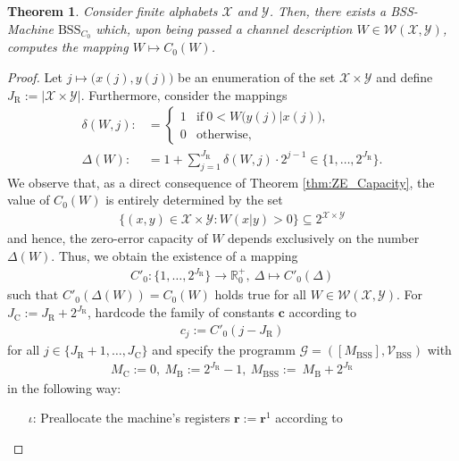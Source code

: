 \documentclass[conference]{IEEEtran}
\def\X{{\mathcal X}}
\def\Y{{\mathcal Y}}
\def\G{{\mathcal G}}
\def\V{{\mathcal V}}
\def\W{{\mathcal W}}
\def\RR{{\mathbb R}}
\newcommand{\BSS}{\mathrm{BSS}}
\newtheorem{Theorem}{Theorem}
\begin{document}
	\begin{Theorem}	\label{thm:ZeroErrorBSScomputable}
					Consider finite alphabets \(\X\) and \(\Y\). Then, there exists a BSS-Machine \(\BSS_{C_0}\)
					which, upon being passed a channel description \(W\in \W(\X,\Y)\), computes the mapping \(W \mapsto C_0(W)\).
	\end{Theorem}\begin{proof}
					Let \(j \mapsto \big(x(j), y(j)\big)\) be an enumeration of the set \(\X\times\Y\) and define
					\(J_\mathrm{R} := |\X\times \Y|\). Furthermore, consider the mappings
					\begin{align*}	\delta(W,j) :&=     \begin{cases}   1   &\text{if}~ 0 < W\big(y(j)|x(j)\big), \\
																		0   &\text{otherwise},
														\end{cases}\\
									\Delta(W)   :&=     1 + \sum_{j=1}^{J_\mathrm{R}} \delta(W,j)\cdot 2^{j-1} \in \big\{1,\ldots,2^{J_\mathrm{R}}\big\}.
					\end{align*} 
					We observe that, as a direct consequence of Theorem \ref{thm:ZE_Capacity}, the value of \(C_0(W)\) is 
					entirely determined by the set 
					\begin{align*}   \{(x,y) \in \X\times \Y : W(x|y) > 0\} \subseteq 2^{\X\times\Y}
					\end{align*} 
					and hence, the zero-error capacity of \(W\) depends exclusively on the number \(\Delta(W)\). Thus, we obtain the existence of a mapping
					\begin{align*}	C'_0 : \big\{1,\ldots,2^{J_\mathrm{R}}\big\} \rightarrow \RR_0^+,~ \Delta \mapsto C'_0(\Delta)        
					\end{align*}
					such that \(C'_0(\Delta(W)) = C_0(W)\) holds true for all \(W\in\W(\X,\Y)\). For \(J_\mathrm{C} := J_\mathrm{R} + 2^{J_\mathrm{R}}\), 
					hardcode the family of constants \(\bm{c}\) according to 
					\begin{align*}   c_j := C'_0(j - J_\mathrm{R})
					\end{align*}
					for all \(j\in \{J_\mathrm{R} + 1, \ldots, J_\mathrm{C}\}\) and specify the programm \(\G = ([M_\BSS],\V_\BSS)\) with
					\begin{align*}	M_\mathrm{C} := 0,~M_\mathrm{B} := 2^{J_\mathrm{R}} - 1,~ M_\BSS := ~M_\mathrm{B} + 2^{J_\mathrm{R}}
					\end{align*}
					in the following way:
					\begin{enumerate}	\item[\(\iota\)\hspace{1pt}:] Preallocate the machine's registers \(\bm{r} := \bm{r}^1\) according to

\end{enumerate}
\end{proof}
\end{document}
